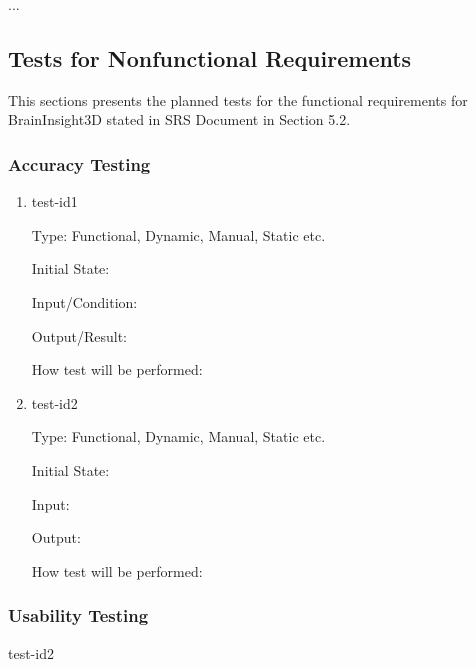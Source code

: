 \documentclass[12pt, titlepage]{article}
\begin{document}
...

\subsection{Tests for Nonfunctional Requirements}

This sections presents the planned tests for the functional requirements for BrainInsight3D stated in SRS Document
\cite{BrainInsightSRS2024} in Section 5.2.




\subsubsection{Accuracy Testing}

\begin{enumerate}

  \item{test-id1\\}

        Type: Functional, Dynamic, Manual, Static etc.

        Initial State:

        Input/Condition:

        Output/Result:

        How test will be performed:

  \item{test-id2\\}

        Type: Functional, Dynamic, Manual, Static etc.

        Initial State:

        Input:

        Output:

        How test will be performed:

\end{enumerate}

\subsubsection{Usability Testing}
\item{test-id2\\}
\end{document}
